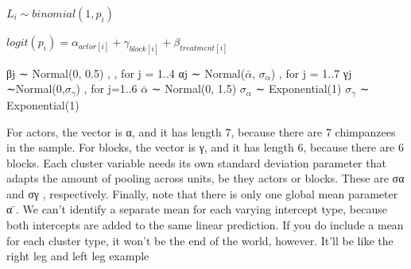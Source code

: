\documentclass[
]{article}
\begin{document}
\(L_i \sim binomial(1,p_i)\)

\(logit(p_i)= \alpha_{actor[i]} + \gamma_{block[i]} + \beta_{treatment[i]}\)

βj ∼ Normal(0, 0.5) , , for j = 1..4 αj ∼ Normal(\(\bar{\alpha}\),
\(\sigma_{\alpha}\)) , for j = 1..7 γj ∼Normal(0,\(\sigma_{\gamma}\)) ,
for j=1..6 \(\bar{\alpha}\) ∼ Normal(0, 1.5) \(\sigma_{\alpha}\) ∼
Exponential(1) \(\sigma_{\gamma}\) ∼ Exponential(1)

For actors, the vector is α, and it has length 7, because there are 7
chimpanzees in the sample. For blocks, the vector is γ, and it has
length 6, because there are 6 blocks. Each cluster variable needs its
own standard deviation parameter that adapts the amount of pooling
across units, be they actors or blocks. These are σα and σγ ,
respectively. Finally, note that there is only one global mean parameter
α ̄. We can't identify a separate mean for each varying intercept type,
because both intercepts are added to the same linear prediction. If you
do include a mean for each cluster type, it won't be the end of the
world, however. It'll be like the right leg and left leg example
\end{document}
